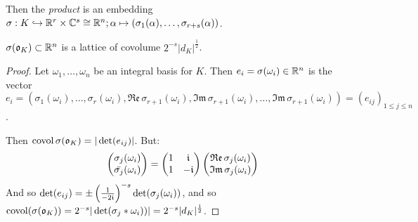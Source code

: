 \documentclass[10pt,a4paper]{article}
\begin{document}
Then the \emph{product} is an embedding $\sigma:K \hookrightarrow \mathbb{R}^r\times \mathbb{C}^s \cong \mathbb{R}^n; \alpha\mapsto (\sigma_1(\alpha), \ldots, \sigma_{r+s}(\alpha))$.

\begin{proposition}
$\sigma(\mathfrak{o}_K) \subset \mathbb{R}^n$ is a lattice of covolume $2^{-s}|d_K|^{\frac12}$.
\end{proposition}
\begin{proof}
Let $\omega_1, \ldots, \omega_n$ be an integral basis for $K$. Then $e_i = \sigma(\omega_i) \in \mathbb{R}^n$ is the vector $e_i = (\sigma_1(\omega_i), \ldots, \sigma_r(\omega_i), \mathfrak{Re}\,\sigma_{r+1}(\omega_i), \mathfrak{Im}\,\sigma_{r+1}(\omega_i), \ldots, \mathfrak{Im}\,\sigma_{r+1}(\omega_i)) = (e_{ij})_{1\leq j \leq n}$.

Then $\operatorname{covol} \sigma(\mathfrak{o}_K) = |\det(e_{ij})|$. But:
\begin{align*}
\begin{pmatrix}
\sigma_j(\omega_i) \\ \bar{\sigma_j}(\omega_i)
\end{pmatrix} = \begin{pmatrix}
1 & \mathfrak{i} \\ 1 & -\mathfrak{i}
\end{pmatrix}\begin{pmatrix}
\mathfrak{Re}\,\sigma_j(\omega_i)\\\mathfrak{Im}\,\sigma_j(\omega_i)
\end{pmatrix}
\end{align*}
And so $\det(e_{ij}) = \pm\left(\frac{1}{-2\mathfrak{i}}\right)^{-s}\det(\sigma_j(\omega_i))$, and so $\operatorname{covol}(\sigma(\mathfrak{o}_K)) = 2^{-s}|\det(\sigma_j*\omega_i))| = 2^{-s}|d_K|^{\frac12}$.
\end{proof}
\end{document}
